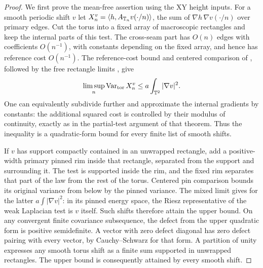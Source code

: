 \begin{proof}
We first prove the mean-free assertion using the XY height inputs.
For a smooth periodic shift \(v\) let
\(X_n^v=\langle h,A_{\mathbb T_n}v(\cdot/n)\rangle\), the sum of
\(\nabla h\,\nabla v(\cdot/n)\) over primary edges.  Cut the torus
into a fixed array of macroscopic rectangles and keep the internal
parts of this test.  The cross-seam part has \(O(n)\) edges with
coefficients \(O(n^{-1})\), with constants depending on the fixed
array, and hence has reference cost \(O(n^{-1})\).  The reference-cost
bound and centered comparison of \cite[Lemmas~2.2--2.3]{C}, followed
by the free rectangle limits \cite[Theorem~2.4]{C}, give
\[
 \limsup_n\operatorname{Var}_{\rm tor}X_n^v\le a\int_{\mathbb T^2}|\nabla v|^2.
\]
One can equivalently subdivide further and approximate the internal
gradients by constants: the additional squared cost is controlled by
their modulus of continuity, exactly as in the partial-test argument
of that theorem.  Thus the inequality is a quadratic-form bound for
every finite list of smooth shifts.

If \(v\) has support compactly contained in an unwrapped rectangle,
add a positive-width primary pinned rim inside that rectangle, separated
from the support and surrounding it.  The test is supported inside the
rim, and the fixed rim separates that part of the law from the rest of
the torus.  Centered pin comparison bounds its original variance from
below by the pinned variance.  The mixed limit \cite[Theorem~3.1]{C} gives
for the latter \(a\int|\nabla v|^2\): in its pinned energy space, the
Riesz representative of the weak Laplacian test is \(v\) itself.
Such shifts therefore attain the upper bound.  On any convergent
finite covariance subsequence, the defect from the upper quadratic
form is positive semidefinite.  A vector with zero defect diagonal
has zero defect pairing with every vector, by Cauchy--Schwarz for that
form.  A partition of unity expresses any smooth torus shift as a finite
sum supported in unwrapped rectangles.  The upper bound is consequently
attained by every smooth shift.


\end{proof}
